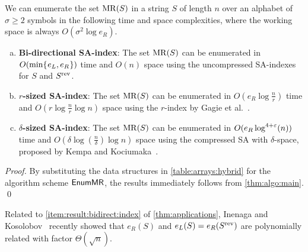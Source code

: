 \begin{theorem}\label{thm:applications}
  We can enumerate the set $\mathrm{MR}(S)$
  in a string $S$ of length $n$ over an alphabet of $\sigma\ge 2$ symbols in the following time and space complexities, where the working space is always $O(\sigma^2 \log e_R)$. 
\newcommand{\mylistheading}{\textbf}
  \begin{enumerate}[(a)]

\item \mylistheading{Bi-directional SA-index}:    
  The set $\mathrm{MR}(S)$ can be enumerated in $O(\min\{\kern0.05eme_L, e_R\kern0.05em\})$ time and $O(n)$ space using the uncompressed SA-indexes for $S$ and $S^{\mathrm{rev}}$. 
  \label{item:result:bidirect:index}
    
  \item \mylistheading{$r$-sized SA-index}:
    The set $\mathrm{MR}(S)$  can be enumerated in $O(e_R \log {\frac n r})$ time and $O(r\log {\frac n r}\log n)$ space using the $r$-index by
    Gagie et al.~\cite{gagie:navarro:prezza2020fully}.
      \label{item:result:compressed:r:index}    
    
  \item \mylistheading{$\delta$-sized SA-index}:
    The set $\mathrm{MR}(S)$ can be enumerated in $O(e_R \log^{4+\varepsilon}(n))$ time and $O(\delta\log({\frac n \delta}) \log n)$ space using the compressed SA with $\delta$-space, proposed by Kempa and Kociumaka~\cite{kempa:kociumaka2023collapsing}.
          \label{item:result:compressed:delta:index}
  \end{enumerate}
\end{theorem}

\begin{proof}
By substituting the data structures in \cref{table:arrays:hybrid} for the algorithm scheme $\textsf{EnumMR}$, the results immediately follows from \cref{thm:algo:main}. \qed
\end{proof}

Related to \ref{item:result:bidirect:index} of \cref{thm:applications}, Inenaga and Kosolobov~\cite{inenaga:kosolobov2024relating:left:right} recently showed that $e_R(S)$ and $e_L(S)= e_R(S^{\mathrm{rev}})$ are polynomially related with factor $\Theta(\sqrt{n})$. 




